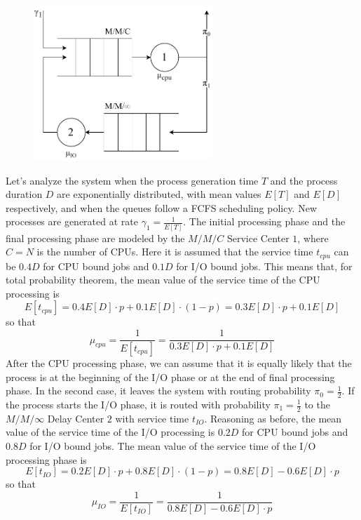 \begin{figure}[h]
    \captionsetup{type=figure}
    \centering
    \includegraphics[width=0.6\textwidth]{images/03/schema.pdf}
    \label{fig:schema}
\end{figure}

Let's analyze the system when the process generation time $T$ and the process duration $D$ are exponentially distributed, with mean values $E[T]$ and $E[D]$ respectively, and when the queues follow a FCFS scheduling policy.
New processes are generated at rate $\gamma_1=\frac{1}{E[T]}$.
The initial processing phase and the final processing phase are modeled by the $M/M/C$ Service Center $1$, where $C=N$ is the number of CPUs. 
Here it is assumed that the service time $t_{cpu}$ can be $0.4D$ for CPU bound jobs and $0.1D$ for I/O bound jobs. This means that, for total probability theorem, the mean value of the service time of the CPU processing is 
\[
E[t_{cpu}]=0.4 E[D] \cdot p+0.1E[D]\cdot (1-p) = 0.3E[D]\cdot p+0.1E[D]
\]
so that 
\[
\mu_{cpu}=\frac{1}{E[t_{cpu}]}=\frac{1}{0.3E[D]\cdot p+0.1E[D]}
\]
After the CPU processing phase, we can assume that it is equally likely that the process is at the beginning of the I/O phase or at the end of final processing phase. In the second case, it leaves the system with routing probability $\pi_0=\frac{1}{2}$.
If the process starts the I/O phase, it is routed with probability $\pi_1=\frac{1}{2}$ to the $M/M/\infty$ Delay Center $2$ with service time $t_{IO}$. 
Reasoning as before, the mean value of the service time of the I/O processing is $0.2D$ for CPU bound jobs and $0.8D$ for I/O bound jobs. The mean value of the service time of the I/O processing phase is
\[
E[t_{IO}]=0.2E[D]\cdot p+0.8E[D]\cdot (1-p)=0.8E[D]-0.6E[D]\cdot p
\]
so that
\[
\mu_{IO}=\frac{1}{E[t_{IO}]}=\frac{1}{0.8E[D]-0.6E[D]\cdot p}
\]

